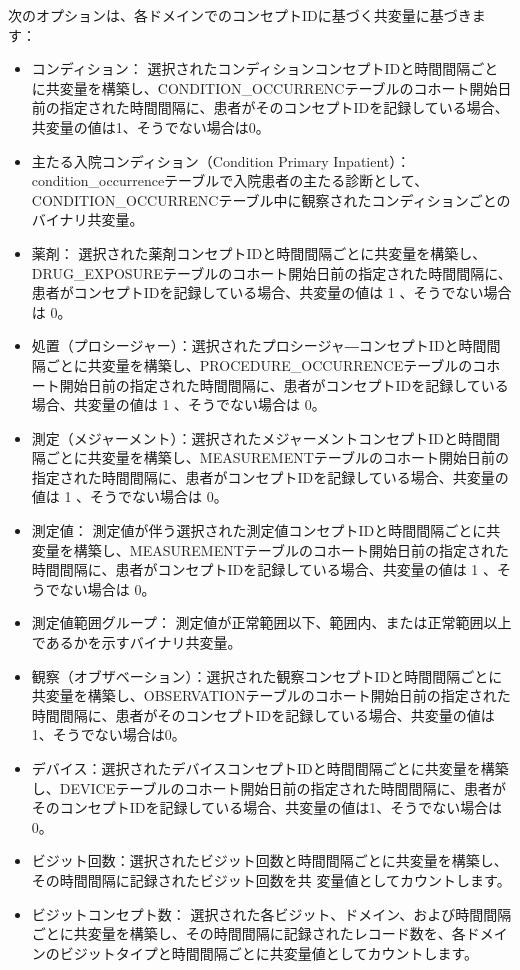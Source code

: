 \documentclass[
  11pt]{book}
\theoremstyle{definition}
\theoremstyle{definition}
\theoremstyle{definition}
\theoremstyle{definition}
\theoremstyle{remark}
\begin{document}
次のオプションは、各ドメインでのコンセプトIDに基づく共変量に基づきます：

\begin{itemize}
\item
  コンディション： 選択されたコンディションコンセプトIDと時間間隔ごとに共変量を構築し、CONDITION\_OCCURRENCテーブルのコホート開始日前の指定された時間間隔に、患者がそのコンセプトIDを記録している場合、共変量の値は1、そうでない場合は0。
\item
  主たる入院コンディション（Condition Primary Inpatient）： condition\_occurrenceテーブルで入院患者の主たる診断として、CONDITION\_OCCURRENCテーブル中に観察されたコンディションごとのバイナリ共変量。
\item
  薬剤： 選択された薬剤コンセプトIDと時間間隔ごとに共変量を構築し、DRUG\_EXPOSUREテーブルのコホート開始日前の指定された時間間隔に、患者がコンセプトIDを記録している場合、共変量の値は 1 、そうでない場合は 0。
\item
  処置（プロシージャー）：選択されたプロシージャ―コンセプトIDと時間間隔ごとに共変量を構築し、PROCEDURE\_OCCURRENCEテーブルのコホート開始日前の指定された時間間隔に、患者がコンセプトIDを記録している場合、共変量の値は 1 、そうでない場合は 0。
\item
  測定（メジャーメント）：選択されたメジャーメントコンセプトIDと時間間隔ごとに共変量を構築し、MEASUREMENTテーブルのコホート開始日前の指定された時間間隔に、患者がコンセプトIDを記録している場合、共変量の値は 1 、そうでない場合は 0。
\item
  測定値： 測定値が伴う選択された測定値コンセプトIDと時間間隔ごとに共変量を構築し、MEASUREMENTテーブルのコホート開始日前の指定された時間間隔に、患者がコンセプトIDを記録している場合、共変量の値は 1 、そうでない場合は 0。
\item
  測定値範囲グループ： 測定値が正常範囲以下、範囲内、または正常範囲以上であるかを示すバイナリ共変量。
\item
  観察（オブザベーション）：選択された観察コンセプトIDと時間間隔ごとに共変量を構築し、OBSERVATIONテーブルのコホート開始日前の指定された時間間隔に、患者がそのコンセプトIDを記録している場合、共変量の値は1、そうでない場合は0。
\item
  デバイス：選択されたデバイスコンセプトIDと時間間隔ごとに共変量を構築し、DEVICEテーブルのコホート開始日前の指定された時間間隔に、患者がそのコンセプトIDを記録している場合、共変量の値は1、そうでない場合は0。
\item
  ビジット回数：選択されたビジット回数と時間間隔ごとに共変量を構築し、その時間間隔に記録されたビジット回数を共 変量値としてカウントします。
\item
  ビジットコンセプト数： 選択された各ビジット、ドメイン、および時間間隔ごとに共変量を構築し、その時間間隔に記録されたレコード数を、各ドメインのビジットタイプと時間間隔ごとに共変量値としてカウントします。
\end{itemize}
\end{document}
